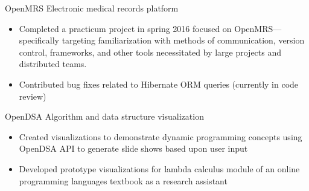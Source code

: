 \cventry[2pt]
    {}
    {OpenMRS} 
    {Electronic medical records platform}
    {}
    {}
    {\begin{itemize}
        \item Completed a practicum project in spring 2016 focused on OpenMRS---specifically
        targeting familiarization with methods of communication, version control, frameworks, and
        other tools necessitated by large projects and distributed teams.
        \item Contributed bug fixes related to Hibernate ORM queries (currently in code review)
    \end{itemize}}
\cventry[2pt]
    {}
    {OpenDSA}
    {Algorithm and data structure visualization}
    {}
    {}
    {\begin{itemize}
        \item Created visualizations to demonstrate dynamic programming concepts using OpenDSA API
        to generate slide shows based upon user input
        \item Developed prototype visualizations for lambda calculus module of an online programming
        languages textbook as a research assistant
    \end{itemize}}